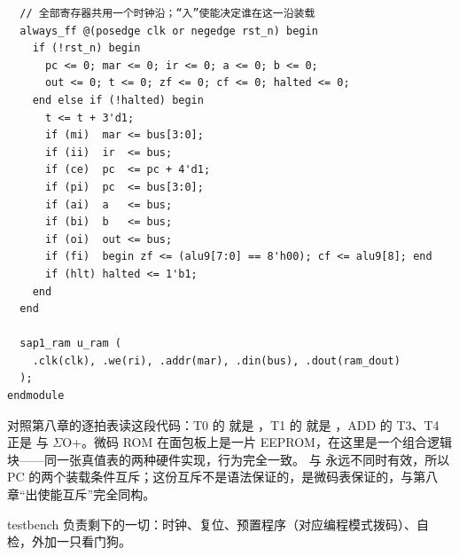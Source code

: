 \begin{lstlisting}
  // 全部寄存器共用一个时钟沿；“入”使能决定谁在这一沿装载
  always_ff @(posedge clk or negedge rst_n) begin
    if (!rst_n) begin
      pc <= 0; mar <= 0; ir <= 0; a <= 0; b <= 0;
      out <= 0; t <= 0; zf <= 0; cf <= 0; halted <= 0;
    end else if (!halted) begin
      t <= t + 3'd1;
      if (mi)  mar <= bus[3:0];
      if (ii)  ir  <= bus;
      if (ce)  pc  <= pc + 4'd1;
      if (pi)  pc  <= bus[3:0];
      if (ai)  a   <= bus;
      if (bi)  b   <= bus;
      if (oi)  out <= bus;
      if (fi)  begin zf <= (alu9[7:0] == 8'h00); cf <= alu9[8]; end
      if (hlt) halted <= 1'b1;
    end
  end

  sap1_ram u_ram (
    .clk(clk), .we(ri), .addr(mar), .din(bus), .dout(ram_dout)
  );
endmodule
\end{lstlisting}

对照第八章的逐拍表读这段代码：T0 的  就是 ，T1 的  就是 ，ADD 的 T3、T4 正是  与 $\Sigma$O+。微码 ROM 在面包板上是一片 EEPROM，在这里是一个组合逻辑块——同一张真值表的两种硬件实现，行为完全一致。 与  永远不同时有效，所以 PC 的两个装载条件互斥；这份互斥不是语法保证的，是微码表保证的，与第八章“出使能互斥”完全同构。

testbench 负责剩下的一切：时钟、复位、预置程序（对应编程模式拨码）、自检，外加一只看门狗。


